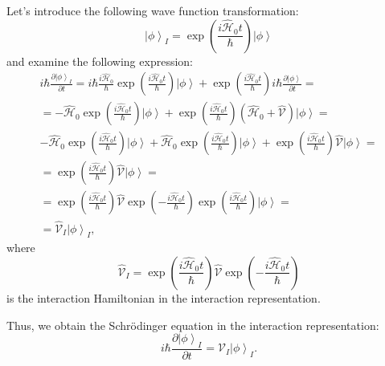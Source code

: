 Let's introduce the following wave function transformation:
\[
\left| \phi \right>_I = 
\exp{\left(\frac{i \hat{\mathcal{H}}_0 t}{\hbar}\right)}
\left| \phi \right>
\]
and examine the following expression:
\begin{eqnarray}
i \hbar \frac{\partial \left| \phi \right>_I}{\partial t} = 
i \hbar \frac{i \hat{\mathcal{H}}_0}{\hbar} 
\exp{\left(\frac{i \hat{\mathcal{H}}_0 t}{\hbar}\right)}
\left| \phi \right> +
\exp{\left(\frac{i \hat{\mathcal{H}}_0 t}{\hbar}\right)}
i \hbar \frac{\partial \left| \phi \right>}{\partial t} = 
\nonumber \\
= - \hat{\mathcal{H}}_0 
\exp{\left(\frac{i \hat{\mathcal{H}}_0 t}{\hbar}\right)}
\left| \phi \right> +
\exp{\left(\frac{i \hat{\mathcal{H}}_0 t}{\hbar}\right)}
\left(
\hat{\mathcal{H}}_0 + \hat{\mathcal{V}}
\right)
\left| \phi \right> =
\nonumber \\ 
- \hat{\mathcal{H}}_0 
\exp{\left(\frac{i \hat{\mathcal{H}}_0 t}{\hbar}\right)}
\left| \phi \right> +
\hat{\mathcal{H}}_0 
\exp{\left(\frac{i \hat{\mathcal{H}}_0 t}{\hbar}\right)}
\left| \phi \right>
+
\exp{\left(\frac{i \hat{\mathcal{H}}_0 t}{\hbar}\right)}
 \hat{\mathcal{V}}
\left| \phi \right> =
\nonumber \\
= 
\exp{\left(\frac{i \hat{\mathcal{H}}_0 t}{\hbar}\right)}
 \hat{\mathcal{V}}
\left| \phi \right> = 
\nonumber \\
= 
\exp{\left(\frac{i \hat{\mathcal{H}}_0 t}{\hbar}\right)}
 \hat{\mathcal{V}}
\exp{\left( - \frac{i \hat{\mathcal{H}}_0 t}{\hbar}\right)}
\exp{\left(\frac{i \hat{\mathcal{H}}_0 t}{\hbar}\right)}
\left| \phi \right> = 
\nonumber \\
= 
 \hat{\mathcal{V}}_I \left| \phi \right>_I,
\nonumber
\end{eqnarray}
where 
\begin{equation}
\hat{\mathcal{V}}_I = 
\exp{\left(\frac{i \hat{\mathcal{H}}_0 t}{\hbar}\right)}
 \hat{\mathcal{V}}
\exp{\left( - \frac{i \hat{\mathcal{H}}_0 t}{\hbar}\right)}
\label{eqAddWaveFunc_VInter}
\end{equation} 
is the interaction Hamiltonian in the interaction representation.

Thus, we obtain the Schrödinger equation in the interaction representation:
\begin{equation}
i \hbar \frac{\partial \left| \phi \right>_I}{\partial t} = \hat{\mathcal{V}}_I
\left| \phi \right>_I.
\label{eqAddWaveFunc_ShredingerInter}
\end{equation}

